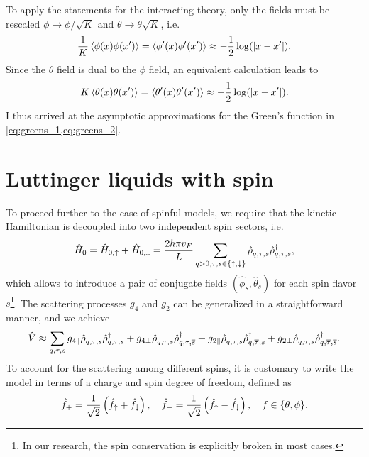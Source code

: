 To apply the statements for the interacting theory, only the fields must be rescaled $\phi\rightarrow\phi/\sqrt K$ and $\theta\rightarrow\theta\sqrt K$, i.e.
\begin{align}
    \frac1K\braket{\phi(x)\phi(x')} = \braket{\phi'(x)\phi'(x')} \approx -\frac12\log(|x-x'|).
    \label{eq:greens_1}
\end{align}
Since the $\theta$ field is dual to the $\phi$ field, an equivalent calculation leads to
\begin{align}
    K\braket{\theta(x)\theta(x')} = \braket{\theta'(x)\theta'(x')} \approx -\frac12\log(|x-x'|).
    \label{eq:greens_2}
\end{align}
I thus arrived at the asymptotic approximations for the Green's function in \cref{eq:greens_1,eq:greens_2}.
%
%
\section{Luttinger liquids with spin}
\label{sec:LL_with_spin}
To proceed further to the case of spinful models, we require that the kinetic Hamiltonian is decoupled into two independent spin sectors, i.e.
\begin{align}
    \hat H_0 = \hat H_{0,\uparrow}+\hat H_{0,\downarrow}
    = \frac{2\hbar\pi v_F}L\sum_{q>0,\tau,s\in\{\uparrow,\downarrow\}}\hat\rho^\pdag_{q,\tau,s}\hat\rho^\dag_{q,\tau,s},
\end{align}
which allows to introduce a pair of conjugate fields $(\hat \phi_s,\hat \theta_s)$ for each spin flavor $s$\footnote{In our research, the spin conservation is explicitly broken in most cases.}.
The scattering processes $g_4$ and $g_2$ can be generalized in a straightforward manner, and we achieve
\begin{align}
  \hat V \approx
  \sum_{q,\tau,s}
  g_{4\parallel}\hat\rho^\pdag_{q,\tau,s}\hat\rho^\dag_{q,\tau,s}
  +
  g_{4\perp}\hat\rho^\pdag_{q,\tau,s}\hat\rho^\dag_{q,\tau,\overline s}
  +
  g_{2\parallel}\hat\rho^\pdag_{q,\tau,s}\hat\rho^\dag_{q,\overline\tau,s}
  +
  g_{2\perp}\hat\rho^\pdag_{q,\tau,s}\hat\rho^\dag_{q,\overline\tau,\overline s}.
\end{align}
To account for the scattering among different spins, it is customary to write the model in terms of a charge and spin degree of freedom, defined as
\begin{align}
    \hat f_+=\frac1{\sqrt2}\left( \hat f_\uparrow + \hat f_\downarrow \right),
    \quad
    \hat f_-=\frac1{\sqrt2}\left( \hat f_\uparrow - \hat f_\downarrow \right),
    \quad
    f\in\{\theta,\phi\}.
\end{align}
